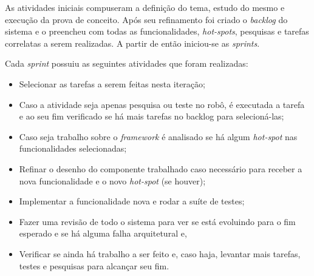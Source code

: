 As atividades iniciais compuseram a definição do tema, estudo do mesmo e execução da prova de conceito. Após seu refinamento foi criado o \textit{backlog} do sistema e o preencheu com todas as funcionalidades, \textit{hot-spots}, pesquisas e tarefas correlatas a serem realizadas. A partir de então iniciou-se as \textit{sprints}.

Cada \textit{sprint} possuiu as seguintes atividades que foram realizadas: 
\begin{itemize}
  \item Selecionar as tarefas a serem feitas nesta iteração;
  \item Caso a atividade seja apenas pesquisa ou teste no robô, é executada a tarefa e ao seu fim verificado se há mais tarefas no backlog para selecioná-las;
  \item Caso seja trabalho sobre o \textit{framework} é analisado se há algum \textit{hot-spot} nas funcionalidades selecionadas;
  \item Refinar o desenho do componente trabalhado caso necessário para receber a nova funcionalidade e o novo \textit{hot-spot} (se houver);
  \item Implementar a funcionalidade nova e rodar a suíte de testes;
  \item Fazer uma revisão de todo o sistema para ver se está evoluindo para o fim esperado e se há alguma falha arquitetural e,
  \item Verificar se ainda há trabalho a ser feito e, caso haja, levantar mais tarefas, testes e pesquisas para alcançar seu fim.
\end{itemize} 

